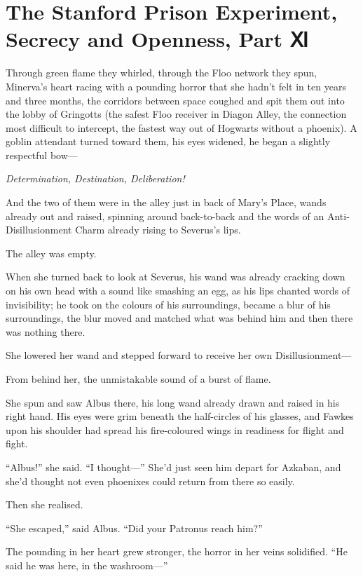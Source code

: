 \chapter{The Stanford Prison Experiment, Secrecy and Openness, Part
Ⅺ}\label{the-stanford-prison-experiment-secrecy-and-openness-part}

Through green flame they whirled, through the Floo network they spun,
Minerva's heart racing with a pounding horror that she hadn't felt in
ten years and three months, the corridors between space coughed and spit
them out into the lobby of Gringotts (the safest Floo receiver in Diagon
Alley, the connection most difficult to intercept, the fastest way out
of Hogwarts without a phoenix). A goblin attendant turned toward them,
his eyes widened, he began a slightly respectful bow---

\emph{Determination, Destination, Deliberation!}

And the two of them were in the alley just in back of Mary's Place,
wands already out and raised, spinning around back-to-back and the words
of an Anti-Disillusionment Charm already rising to Severus's lips.

The alley was empty.

When she turned back to look at Severus, his wand was already cracking
down on his own head with a sound like smashing an egg, as his lips
chanted words of invisibility; he took on the colours of his
surroundings, became a blur of his surroundings, the blur moved and
matched what was behind him and then there was nothing there.

She lowered her wand and stepped forward to receive her own
Disillusionment---

From behind her, the unmistakable sound of a burst of flame.

She spun and saw Albus there, his long wand already drawn and raised in
his right hand. His eyes were grim beneath the half-circles of his
glasses, and Fawkes upon his shoulder had spread his fire-coloured wings
in readiness for flight and fight.

``Albus!'' she said. ``I thought---'' She'd just seen him depart for
Azkaban, and she'd thought not even phoenixes could return from there so
easily.

Then she realised.

``She escaped,'' said Albus. ``Did your Patronus reach him?''

The pounding in her heart grew stronger, the horror in her veins
solidified. ``He said he was here, in the washroom---''

